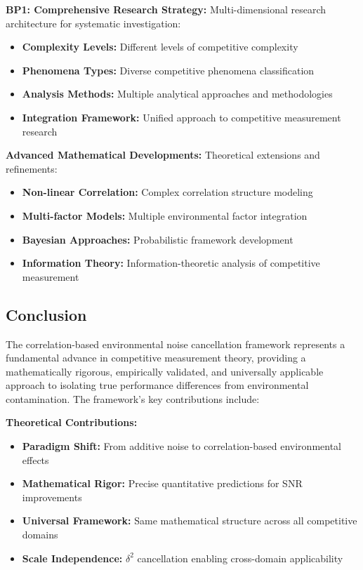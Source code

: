 \textbf{BP1: Comprehensive Research Strategy:}
Multi-dimensional research architecture for systematic investigation:
\begin{itemize}
    \item \textbf{Complexity Levels:} Different levels of competitive complexity
    \item \textbf{Phenomena Types:} Diverse competitive phenomena classification
    \item \textbf{Analysis Methods:} Multiple analytical approaches and methodologies
    \item \textbf{Integration Framework:} Unified approach to competitive measurement research
\end{itemize}

\textbf{Advanced Mathematical Developments:}
Theoretical extensions and refinements:
\begin{itemize}
    \item \textbf{Non-linear Correlation:} Complex correlation structure modeling
    \item \textbf{Multi-factor Models:} Multiple environmental factor integration
    \item \textbf{Bayesian Approaches:} Probabilistic framework development
    \item \textbf{Information Theory:} Information-theoretic analysis of competitive measurement
\end{itemize}

\subsection{Conclusion}

The correlation-based environmental noise cancellation framework represents a fundamental advance in competitive measurement theory, providing a mathematically rigorous, empirically validated, and universally applicable approach to isolating true performance differences from environmental contamination. The framework's key contributions include:

\textbf{Theoretical Contributions:}
\begin{itemize}
    \item \textbf{Paradigm Shift:} From additive noise to correlation-based environmental effects
    \item \textbf{Mathematical Rigor:} Precise quantitative predictions for SNR improvements
    \item \textbf{Universal Framework:} Same mathematical structure across all competitive domains
    \item \textbf{Scale Independence:} $\delta^2$ cancellation enabling cross-domain applicability
\end{itemize}

